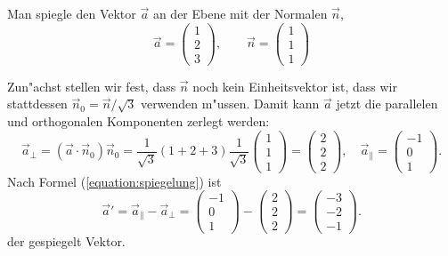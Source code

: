 \begin{beispiel}
Man spiegle den Vektor $\vec a$ an der Ebene mit der Normalen $\vec n$,
\[
\vec a=\begin{pmatrix}1\\2\\3\end{pmatrix},
\qquad
\vec n=\begin{pmatrix}1\\1\\1\end{pmatrix}
\]

\smallskip

{\parindent 0pt Zun"achst stellen wir fest,} dass $\vec n$ noch
kein Einheitsvektor ist, dass wir stattdessen $\vec n_0=\vec n/\sqrt{3}$
verwenden m"ussen.
Damit kann $\vec a$ jetzt die parallelen und orthogonalen
Komponenten zerlegt werden:
\[
\vec a_{\perp}=(\vec a\cdot\vec n_0)\vec n_0
=\frac1{\sqrt{3}} (1+2+3)\frac1{\sqrt{3}}\begin{pmatrix}1\\1\\1\end{pmatrix}
=\begin{pmatrix}2\\2\\2\end{pmatrix},
\quad
\vec a_{\|}=\begin{pmatrix} -1\\0\\1 \end{pmatrix}.
\]
Nach Formel (\ref{equation:spiegelung}) ist
\[
\vec a'=\vec a_{\|}-\vec a_{\perp}
=
\begin{pmatrix}-1\\0\\1\end{pmatrix}-\begin{pmatrix}2\\2\\2\end{pmatrix}
=\begin{pmatrix}-3\\-2\\-1\end{pmatrix}.
\]
der gespiegelt Vektor.
\end{beispiel}

